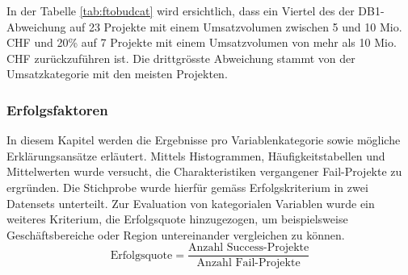 \newline In der Tabelle \ref{tab:ftobudcat} wird ersichtlich, dass ein Viertel des der DB1-Abweichung auf 23 Projekte mit einem Umsatzvolumen zwischen 5 und 10 Mio. CHF und 20\% auf 7 Projekte mit einem Umsatzvolumen von mehr als 10 Mio. CHF zurückzuführen ist. Die drittgrösste Abweichung stammt von der Umsatzkategorie mit den meisten Projekten.
\subsubsection{Erfolgsfaktoren}
In diesem Kapitel werden die Ergebnisse pro Variablenkategorie sowie mögliche Erklärungsansätze erläutert. Mittels Histogrammen, Häufigkeitstabellen und Mittelwerten wurde versucht, die Charakteristiken vergangener Fail-Projekte zu ergründen. Die Stichprobe wurde hierfür gemäss Erfolgskriterium in zwei Datensets unterteilt. Zur Evaluation von kategorialen Variablen wurde ein weiteres Kriterium, die Erfolgsquote hinzugezogen, um beispielsweise Geschäftsbereiche oder Region untereinander vergleichen zu können.
\newline
\begin{equation}
\text{Erfolgsquote} = \frac{\text{{Anzahl Success-Projekte}}}{\text{Anzahl Fail-Projekte}}
\end{equation}

